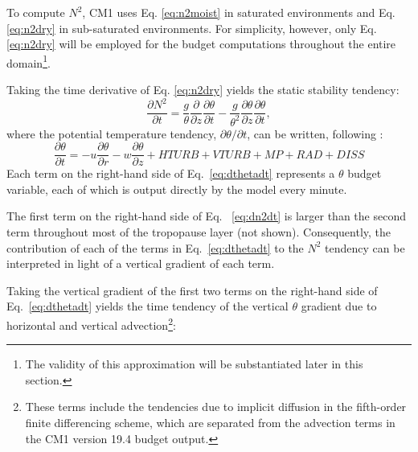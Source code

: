 To compute $N^2$, CM1 uses Eq. \ref{eq:n2moist} in saturated environments and Eq. \ref{eq:n2dry} in sub-saturated environments. For simplicity, however, only Eq. \ref{eq:n2dry} will be employed for the budget computations throughout the entire domain\footnote{The validity of this approximation will be substantiated later in this section.}.

Taking the time derivative of Eq. \ref{eq:n2dry} yields the static stability tendency:
   \begin{equation} \label{eq:dn2dt}
   \frac{\partial N^2}{\partial t} = \frac{g}{\theta}\frac{\partial}{\partial z}\frac{\partial \theta}{\partial t}-\frac{g}{\theta^2}\frac{\partial \theta}{\partial z}\frac{\partial \theta}{\partial t},
   \end{equation}
where the potential temperature tendency, $\partial \theta/\partial t$, can be written, following \cite{Bryan2017}:
   \begin{equation} \label{eq:dthetadt}
   \frac{\partial \theta}{\partial t} = -u\frac{\partial\theta}{\partial r}-w\frac{\partial \theta}{\partial z}+HTURB+VTURB+MP+RAD+DISS
   \end{equation}
Each term on the right-hand side of Eq.~\ref{eq:dthetadt} represents a $\theta$ budget variable, each of which is output directly by the model every minute.

The first term on the right-hand side of Eq. ~\ref{eq:dn2dt} is larger than the second term throughout most of the tropopause layer (not shown).
Consequently, the contribution of each of the terms in Eq.~\ref{eq:dthetadt} to the $N^2$ tendency can be interpreted in light of a vertical gradient of each term.

Taking the vertical gradient of the first two terms on the right-hand side of Eq.~\ref{eq:dthetadt} yields the time tendency of the vertical $\theta$ gradient due to horizontal and vertical advection\footnote{These terms include the tendencies due to implicit diffusion in the fifth-order finite differencing scheme, which are separated from the advection terms in the CM1 version 19.4 budget output.}:

